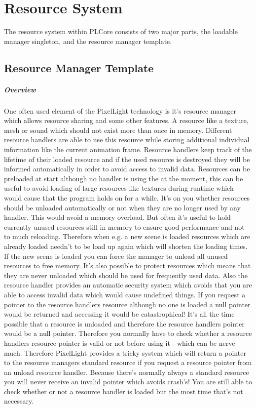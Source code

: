 \chapter{Resource System}
The resource system within PLCore consists of two major parts, the loadable manager singleton, and the resource manager template.




\section{Resource Manager Template}


\paragraph{Overview}
One often used element of the PixelLight technology is it's resource manager which allows resource sharing and some other features. A resource like a texture, mesh or sound which should not exist more than once in memory. Different resource handlers are able to use this resource while storing additional individual information like the current animation frame. Resource handlers keep track of the lifetime of their loaded resource and if the used resource is destroyed they will be informed automatically in order to avoid access to invalid data. Resources can be preloaded at start although no handler is using the at the moment, this can be useful to avoid loading of large resources like textures during runtime which would cause that the program holds on for a while. It's on you whether resources should be unloaded automatically or not when they are no longer used by any handler. This would avoid a memory overload. But often it's useful to hold currently unused resources still in memory to ensure good performance and not to much reloading. Therefore when e.g. a new scene is loaded resources which are already loaded needn't to be load up again which will shorten the loading times. If the new scene is loaded you can force the manager to unload all unused resources to free memory. It's also possible to protect resources which means that they are never unloaded which should be used for frequently used data. Also the resource handler provides an automatic security system which avoids that you are able to access invalid data which would cause undefined things. If you request a pointer to the resource handlers resource although no one is loaded a null pointer would be returned and accessing it would be catastrophical! It's all the time possible that a resource is unloaded and therefore the resource handlers pointer would be a null pointer. Therefore you normally have to check whether a resource handlers resource pointer is valid or not before using it - which can be nerve much. Therefore PixelLight provides a tricky system which will return a pointer to the resource managers standard resource if you request a resource pointer from an unload resource handler. Because there's normally always a standard resource you will never receive an invalid pointer which avoids crash's! You are still able to check whether or not a resource handler is loaded but the most time that's not necessary.

